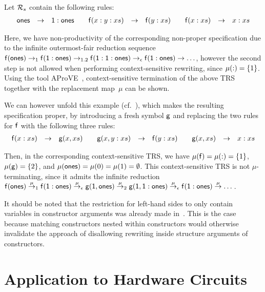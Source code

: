 \documentclass{eptcs}
\begin{document}
\begin{example}
\label{ex:CexpConsNonVarArg}
Let $\mathcal{R}_s$ contain the following rules:
\[
\begin{array}{rcl@{\qquad}rcl@{\qquad}rcl}
\fsym{ones} &\to& \one : \fsym{ones}
&
\fsym{f}(x : y : xs) &\to& \fsym{f}(y : xs)
&
\fsym{f}(x : xs) &\to& x : xs
\end{array}
\]

Here, we have non-productivity of the corresponding non-proper specification due
to the infinite outermost-fair reduction sequence
$\mathsf{f}(\mathsf{ones}) \to_1 \mathsf{f}(\mathsf{1} : \mathsf{ones}) \to_{1.2}
\mathsf{f}(\mathsf{1} : \mathsf{1} : \mathsf{ones}) \to_{\epsilon} \mathsf{f}(\mathsf{1} : \mathsf{ones})
\to \ldots$,
however the second step is not allowed when performing context-sensitive
rewriting, since $\mu(\mathsf{:}) = \{ 1 \}$.
Using the tool AProVE~\cite{AProVE06}, context-sensitive termination of the
above TRS together with the replacement map~$\mu$ can be shown.


We can however unfold this example (cf.~\cite{EH11,Z09}),
which makes the resulting specification
proper, by introducing a fresh symbol $\mathsf{g}$ and replacing the two
rules for $\mathsf{f}$ with the following three rules:
\[
\begin{array}{rcl@{\qquad}rcl@{\qquad}rcl}
\fsym{f}(x : xs) &\to& \fsym{g}(x,xs)
&
\fsym{g}(x, y:xs) &\to& \fsym{f}(y:xs)
&
\fsym{g}(x,xs) &\to& x : xs
\end{array}
\]

Then, in the corresponding context-sensitive TRS, we have
$\mu(\mathsf{f}) = \mu(\mathsf{:}) = \{ 1 \}$, $\mu(\mathsf{g}) = \{ 2 \}$, and
$\mu(\mathsf{ones}) = \mu(0) = \mu(1) = \emptyset$.
This context-sensitive TRS is not $\mu$-terminating, since it admits the
infinite reduction
$
\mathsf{f}(\mathsf{ones})
\mathrel{\smash{\overset{\mu}{\rightarrow}}}_{1}
\mathsf{f}(\mathsf{1} : \mathsf{ones})
\mathrel{\smash{\overset{\mu}{\rightarrow}}}_{\epsilon}
\mathsf{g}(\mathsf{1}, \mathsf{ones})
\mathrel{\smash{\overset{\mu}{\rightarrow}}}_{2}
\mathsf{g}(\mathsf{1}, \mathsf{1} : \mathsf{ones})
\mathrel{\smash{\overset{\mu}{\rightarrow}}}_{\epsilon}
\mathsf{f}(\mathsf{1} : \mathsf{ones})
\mathrel{\smash{\overset{\mu}{\rightarrow}}}
\dots
$.
\end{example}

It should be noted that the restriction for left-hand sides to only contain
variables in constructor arguments was already made in~\cite{ZR10}. This is the
case because matching constructors nested within constructors would otherwise
invalidate the approach of disallowing rewriting inside structure arguments of
constructors.



\section{Application to Hardware Circuits}
\label{sec:ApplHW}
\end{document}
